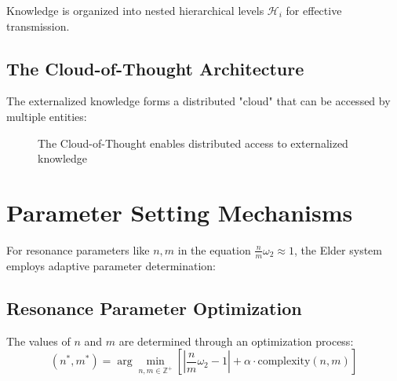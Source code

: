 Knowledge is organized into nested hierarchical levels $\mathcal{H}_i$ for effective transmission.

\subsection{The Cloud-of-Thought Architecture}

The externalized knowledge forms a distributed "cloud" that can be accessed by multiple entities:

\begin{figure}[h]
\centering
{}
\caption{The Cloud-of-Thought enables distributed access to externalized knowledge}
\end{figure}

\section{Parameter Setting Mechanisms}

For resonance parameters like $n, m$ in the equation $\frac{n}{m}\omega_2 \approx 1$, the Elder system employs adaptive parameter determination:

\subsection{Resonance Parameter Optimization}

The values of $n$ and $m$ are determined through an optimization process:
\begin{equation}
(n^*, m^*) = \arg\min_{n,m \in \mathbb{Z}^+} \left[ \left|\frac{n}{m}\omega_2 - 1\right| + \alpha \cdot \text{complexity}(n,m) \right]
\end{equation}

